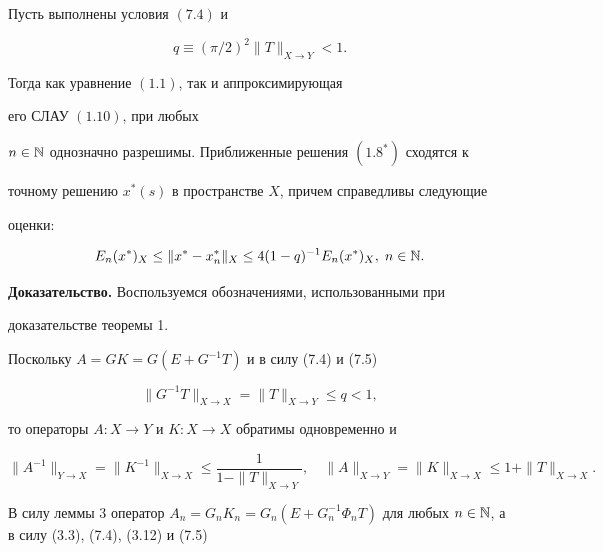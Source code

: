 \begin{thm}


Пусть выполнены условия $(7.4)$ и


\begin{equation}


q \equiv ({\pi}/{2})^2\|T\|_{X\to Y}<1.


\end{equation}


Тогда как уравнение $(1.1)$, так и аппроксимирующая 


его СЛАУ $(1.10)$, при любых


$n\in \Bbb N$ однозначно разрешимы. Приближенные решения $(1.8^*)$ сходятся к


точному решению $x^*(s)$ в пространстве $X$, причем справедливы следующие


оценки$:$


\begin{equation}


E_n(x^*)_X\le \|x^*-x^*_n\|_X\le 4(1-q)^{-1}E_n(x^*)_X,\; n\in \N.


\end{equation}


\end{thm}





{\bf Доказательство.} Воспользуемся обозначениями, использованными при


доказательстве теоремы 1.


Поскольку $A=GK=G(E+G^{-1}T)$ и в силу (7.4) и (7.5)


$$


\|G^{-1}T\|_{X\to X}=\|T\|_{X\to Y}\le q <1,


$$


то операторы $A:X\to Y$ и $K:X\to X$ обратимы одновременно и


\begin{equation}


\|A^{-1}\|_{Y\to X}=\|K^{-1}\|_{X\to X}\le \frac{1}{1-\|T\|_{X\to Y}},\quad


\|A\|_{X\to Y}=\|K\|_{X\to X}\le 1+\|T\|_{X\to X}.


\end{equation}





В силу леммы 3 оператор $A_n=G_nK_n=G_n(E+G^{-1}_n\Phi_nT)$ для любых $n


\in \N$, а в силу (3.3), (7.4), (3.12) и (7.5)


